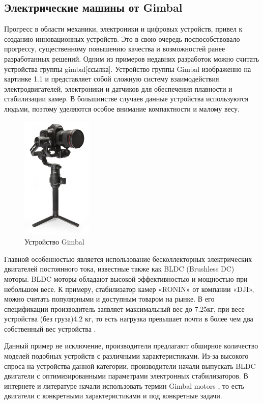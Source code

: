 \subsection{Электрические машины от Gimbal}
Прогресс в области механики, электроники и цифровых устройств, привел к созданию инновационных устройств. Это в свою очередь поспособствовало прогрессу, существенному повышению качества и возможностей ранее разработанных решений. Одним из примеров недавних разработок можно считать устройства группы gimbal[ссылка]. Устройство группы Gimbal изображенно на картинке 1.1 и представляет собой сложную систему взаимодействия электродвигателей, электроники и датчиков для обеспечения плавности и стабилизации камер. В большинстве случаев данные устройства используются людьми, поэтому уделяются особое внимание компактности и малому весу. 

\begin{figure}[H]
	\centering
	\includegraphics[width=0.3\textwidth]{Src/images/Gimbal.png}
	\caption{Устройство Gimbal}
\end{figure}

Главной особенностью является использование бесколлекторных электрических двигателей постоянного тока, известные также как BLDC (Brushless DC) моторы. BLDC моторы обладают высокой эффективностью и мощностью при небольшом весе. К примеру, стабилизатор камер «RONIN» от компании «DJI», можно считать популярными и доступным товаром на рынке. В его спецификации производитель заявляет максимальный вес до 7.25кг, при весе устройства (без груза)4.2 кг, то есть нагрузка превышает почти в более чем два собственный вес устройства 
\citep{ronin23}.

Данный пример не исключение, производители предлагают обширное количество моделей подобных устройств с различными характеристиками. Из-за высокого спроса на устройства данной категории, производители начали выпускать BLDC двигатели с оптимизированными параметрами электронных стабилизаторов. В интернете и литературе начали использовать термин Gimbal motors \citep{Lee2018}, то есть двигатели с конкретными характеристиками и под конкретные задачи. 

